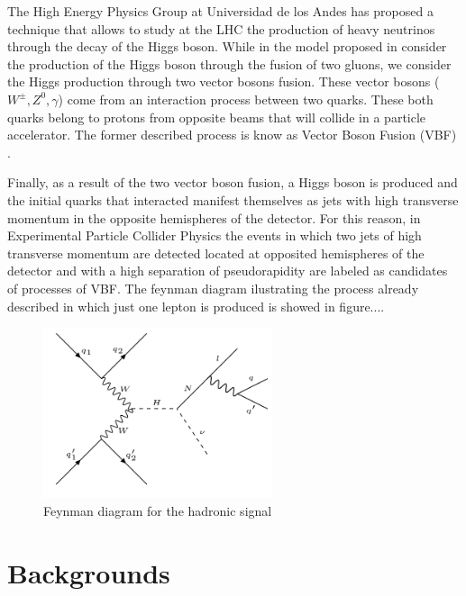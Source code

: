 The High Energy Physics Group at Universidad de los Andes has proposed a technique that allows to study at the LHC the production of heavy neutrinos through the decay of the Higgs boson. While in the model proposed in \cite{Seesaw Mechanism with displace vertices} consider the production of the Higgs boson through the fusion of two gluons, we consider the Higgs production through two vector bosons fusion. These vector bosons ($W^{\pm},Z^0,\gamma$) come from an interaction process between two quarks. These both quarks belong to protons from opposite beams that will collide in a particle accelerator. The former described process is know as Vector Boson Fusion (VBF) \cite{VBF processes}. 

Finally, as a result of the two vector boson fusion, a Higgs boson is produced and the initial quarks that interacted manifest themselves as jets with high transverse momentum in the opposite hemispheres of the detector. For this reason, in Experimental Particle Collider Physics the events in which two jets of high transverse momentum are detected located at opposited hemispheres of the detector and with a high separation of pseudorapidity are labeled as candidates of processes of VBF. The feynman diagram ilustrating the process already described in which just one lepton is produced is showed in figure....

\begin{figure}[h] \label{Signal_feynman}
\centering
\caption{Feynman diagram for the hadronic signal}
\includegraphics[width=0.6\textwidth]{./Capitulos/Model/signal}  
\end{figure}

 
 
 \section{Backgrounds}
 
